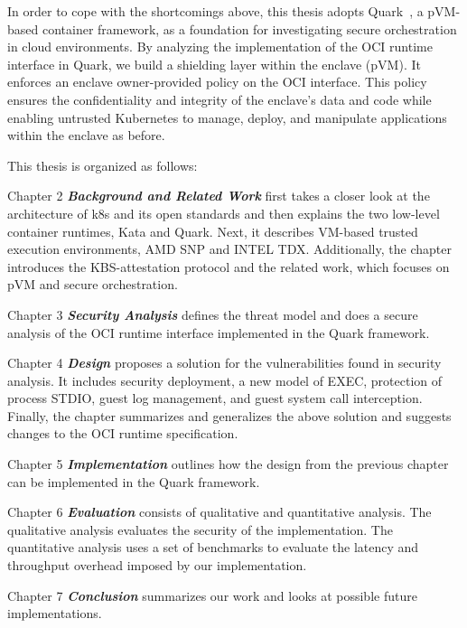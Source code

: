 In order to cope with the shortcomings above, this thesis adopts Quark~\cite*{quark}, a pVM-based container framework, as a foundation for investigating secure orchestration in cloud environments. By analyzing the implementation of the OCI runtime interface in Quark, we build a shielding layer within the 
enclave (pVM). It enforces an enclave owner-provided policy on the OCI interface. This policy ensures the confidentiality and integrity of the enclave's data and code while enabling untrusted Kubernetes to manage, deploy, and manipulate applications within the enclave as before.
 
This thesis is organized as follows:

\begin{hangparas}{.25in}{1} 
Chapter 2 \textit{\textbf{Background and Related Work}} first takes a closer look at the architecture of k8s and its open standards and then explains the two low-level container runtimes, Kata and Quark. Next, it describes VM-based trusted execution environments, AMD SNP and INTEL TDX. Additionally, the chapter 
introduces the KBS-attestation protocol and the related work, which focuses on pVM and secure orchestration.

Chapter 3 \textit{\textbf{Security Analysis}} defines the threat model and does a secure analysis of the OCI runtime interface implemented in the Quark framework.

Chapter 4 \textit{\textbf{Design}} proposes a solution for the vulnerabilities found in security analysis. It includes security deployment, a new model of EXEC, protection of process STDIO, guest log management, and guest system call interception. Finally, the chapter summarizes and generalizes the above solution and suggests changes to the OCI runtime specification.

Chapter 5 \textit{\textbf{Implementation}} outlines how the design from the previous chapter can be implemented in the Quark framework.

Chapter 6 \textit{\textbf{Evaluation}} consists of qualitative and quantitative analysis. The qualitative analysis evaluates the security of the implementation. The quantitative analysis uses a set of benchmarks to evaluate the latency and throughput overhead imposed by our implementation.

Chapter 7 \textit{\textbf{Conclusion}} summarizes our work and looks at possible future implementations.

\end{hangparas}

\cleardoublepage

